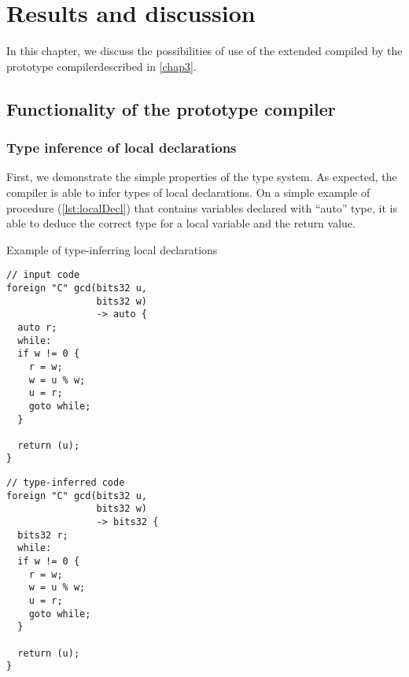 \chapter{Results and discussion}
\label{chap4}

In this chapter, we discuss the possibilities of use of the extended \cmm compiled by the prototype compiler\cmmrepo described in \cref{chap3}.

\section{Functionality of the prototype compiler}
\label{sec:protoComp}

\subsection{Type inference of local declarations}

First, we demonstrate the simple properties of the type system. As expected, the compiler is able to infer types of local declarations. On a simple example of  procedure (\cref{lst:localDecl}) that contains variables declared with ``auto'' type, it is able to deduce the correct type for a local variable and the return value.

\begin{codex}
    \caption{Example of type-inferring local declarations}
    \label{lst:localDecl}
    \begin{center}
    \begin{minipage}{0.5\linewidth}
    \begin{lstlisting}
// input code
foreign "C" gcd(bits32 u,
                bits32 w)
                -> auto {
  auto r;
  while:
  if w != 0 {
    r = w;
    w = u % w;
    u = r;
    goto while;
  }

  return (u);
}
    \end{lstlisting}
    \end{minipage}%
    \begin{minipage}{0.5\linewidth}
    \begin{lstlisting}
// type-inferred code
foreign "C" gcd(bits32 u,
                bits32 w)
                -> bits32 {
  bits32 r;
  while:
  if w != 0 {
    r = w;
    w = u % w;
    u = r;
    goto while;
  }

  return (u);
}
    \end{lstlisting}
    \end{minipage}
    \end{center}
\end{codex}

